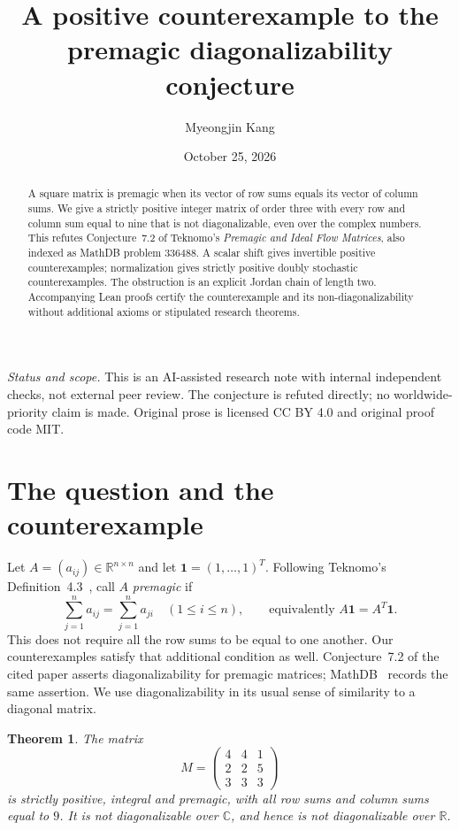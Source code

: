 \documentclass[11pt]{article}
\title{A positive counterexample to the\\premagic diagonalizability conjecture}
\author{Myeongjin Kang}
\date{October 25, 2026}
\newtheorem{theorem}{Theorem}
\theoremstyle{remark}\newtheorem{remark}[theorem]{Remark}
\newcommand{\R}{\mathbb R}
\newcommand{\C}{\mathbb C}
\newcommand{\one}{\mathbf 1}
\begin{document}
\maketitle
\begin{abstract}
A square matrix is premagic when its vector of row sums equals its
vector of column sums. We give a strictly positive integer matrix of
order three with every row and column sum equal to nine that is not
diagonalizable, even over the complex numbers. This refutes Conjecture~7.2
of Teknomo's \emph{Premagic and Ideal Flow Matrices}, also indexed as
MathDB problem 336488. A scalar shift gives invertible positive
counterexamples; normalization gives strictly positive doubly stochastic
counterexamples. The obstruction is an explicit Jordan chain of length
two. Accompanying Lean proofs certify the counterexample and its
non-diagonalizability without additional axioms or stipulated research
theorems.
\end{abstract}
\noindent\textit{Status and scope.} This is an AI-assisted research note
with internal independent checks, not external peer review. The
conjecture is refuted directly; no worldwide-priority claim is made.
Original prose is licensed CC BY 4.0 and original proof code MIT.

\section{The question and the counterexample}
Let $A=(a_{ij})\in\R^{n\times n}$ and let $\one=(1,\ldots,1)^T$.
Following Teknomo's Definition~4.3~\cite{Teknomo}, call $A$ \emph{premagic}
if
\begin{equation}\label{eq:premagic}
 \sum_{j=1}^n a_{ij}=\sum_{j=1}^n a_{ji}\quad(1\leq i\leq n),
 \qquad\text{equivalently } A\one=A^T\one.
\end{equation}
This does not require all the row sums to be equal to one another.
Our counterexamples satisfy that additional condition as well.
Conjecture~7.2 of the cited paper asserts diagonalizability for premagic
matrices; MathDB~\cite{MathDB} records the same assertion. We use
diagonalizability in its usual sense of similarity to a diagonal matrix.

\begin{theorem}\label{thm:main}
The matrix
\[
 M=\begin{pmatrix}4&4&1\\2&2&5\\3&3&3\end{pmatrix}
\]
is strictly positive, integral and premagic, with all row sums and
column sums equal to $9$. It is not diagonalizable over $\C$, and hence
is not diagonalizable over $\R$.
\end{theorem}
\end{document}
